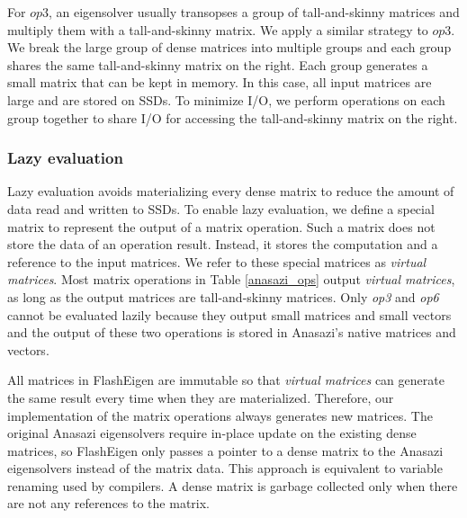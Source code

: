 For $op3$, an eigensolver usually transopses a group of tall-and-skinny matrices
and multiply them with a tall-and-skinny matrix. We apply a similar strategy to
$op3$. We break the large group of dense matrices into multiple groups and each
group shares the same tall-and-skinny matrix on the right. Each group generates
a small matrix that can be kept in memory. In this case, all input matrices
are large and are stored on SSDs. To minimize I/O, we perform operations on
each group together to share I/O for accessing the tall-and-skinny matrix
on the right.


\subsubsection{Lazy evaluation} \label{sec:lazy_eval}
Lazy evaluation avoids materializing every dense matrix to reduce the amount
of data read and written to SSDs.
To enable lazy evaluation, we define a special matrix to represent the output
of a matrix operation. Such a matrix does not store the data of
an operation result. Instead, it stores the computation and a reference to
the input matrices. We refer to these special matrices as \textit{virtual matrices}.
Most matrix operations in Table \ref{anasazi_ops} output \textit{virtual matrices},
as long as the output matrices are tall-and-skinny matrices. Only \textit{op3}
and \textit{op6} cannot be evaluated lazily because they output small matrices
and small vectors and the output of these two operations is stored in Anasazi's
native matrices and vectors.


All matrices in FlashEigen are immutable so that \textit{virtual matrices}
can generate the same result every time when they are materialized. Therefore,
our implementation of the matrix operations always generates new matrices.
The original Anasazi eigensolvers require in-place update on the existing dense
matrices, so FlashEigen only passes a pointer to a dense matrix to the Anasazi
eigensolvers instead of the matrix data. This approach is equivalent to variable
renaming used by compilers.
A dense matrix is garbage collected only when there are not any references to
the matrix.

